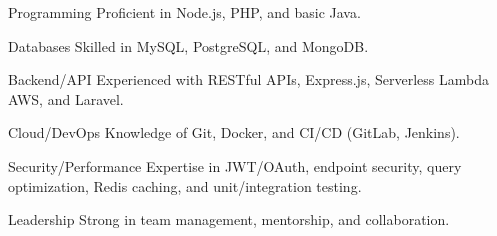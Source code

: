 

\begin{cvskills}

  \cvskill
    {Programming} %
    {Proficient in Node.js, PHP, and basic Java.} %

  \cvskill
    {Databases} %
    {Skilled in MySQL, PostgreSQL, and MongoDB.} %

  \cvskill
    {Backend/API} %
    {Experienced with RESTful APIs, Express.js, Serverless Lambda AWS, and Laravel.} %

  \cvskill
    {Cloud/DevOps} %
    {Knowledge of Git, Docker, and CI/CD (GitLab, Jenkins).} %

  \cvskill
    {Security/Performance} %
    {Expertise in JWT/OAuth, endpoint security, query optimization, Redis caching, and unit/integration testing.} %

  \cvskill
    {Leadership} %
    {Strong in team management, mentorship, and collaboration.} %

\end{cvskills}
